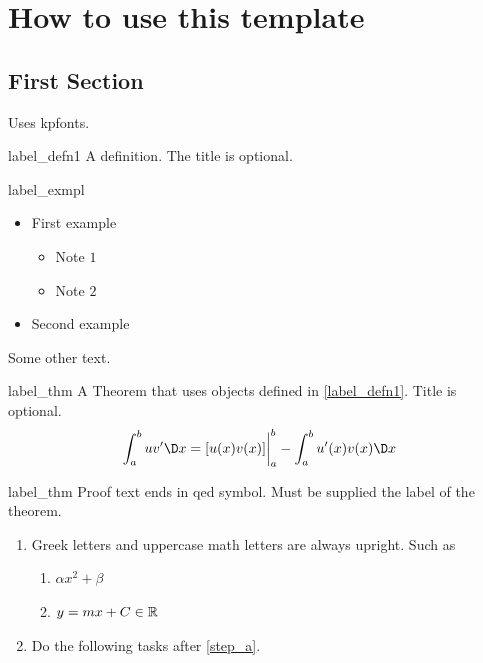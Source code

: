 \chapter{How to use this template}

\section{First Section}

Uses kpfonts.

\begin{defn}{label_defn1}
	A definition. The title is optional.
\end{defn}



\begin{exmpl}[Title]{label_exmpl}
	\begin{itemize}
		\item First example 
		\begin{itemize}
			\item  Note $1$
			\item  Note $2$
		\end{itemize}
		\item Second example
	\end{itemize}
\end{exmpl}    



Some other text.

\begin{theo}{label_thm}
	A Theorem that uses objects defined in \cref{label_defn1}. Title is optional. 
	\[\dint_a^b u v' \dx = [u(x)v(x)] \eval_a^b - \dint_a^b u'(x) v(x) \dx\]
\end{theo}


\begin{prf}{label_thm}
	Proof text ends in qed symbol. Must be supplied the label of the theorem.
\end{prf}


\begin{exercise}\label{question_label}
	\begin{enumerate}
		\item Greek letters and uppercase math letters are always upright. Such as \label{step_a}
		\begin{enumerate}
			\item  $\alpha x^2 +\beta$ \label{substep_a_i} 
			\item  $y =mx+ C \in \mathbb{R}$ 
		\end{enumerate}
		
		\item Do the  following tasks after \ref{step_a}.
  
\end{enumerate}
\end{exercise}

